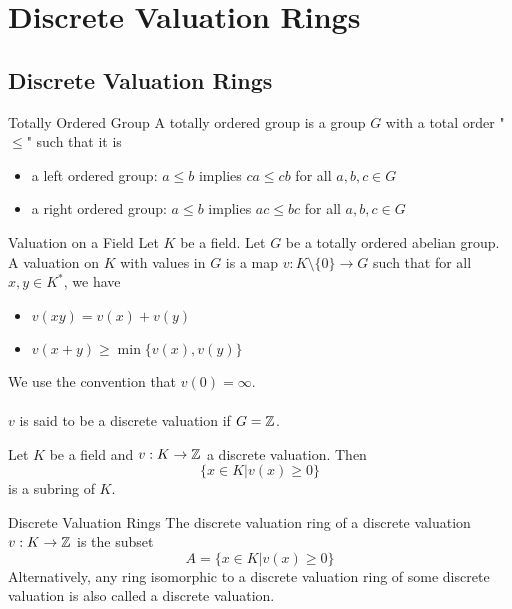 \documentclass[a4paper]{article}
\begin{document}
\pagebreak
\section{Discrete Valuation Rings}
\subsection{Discrete Valuation Rings}
\begin{defn}{Totally Ordered Group}{} A totally ordered group is a group $G$ with a total order "$\leq$" such that it is
\begin{itemize}
\item a left ordered group: $a\leq b$ implies $ca\leq cb$ for all $a,b,c\in G$
\item a right ordered group: $a\leq b$ implies $ac\leq bc$ for all $a,b,c\in G$
\end{itemize}
\end{defn}

\begin{defn}{Valuation on a Field}{} Let $K$ be a field. Let $G$ be a totally ordered abelian group. A valuation on $K$ with values in $G$ is a map $v:K\setminus\{0\}\to G$ such that for all $x,y\in K^\ast$, we have 
\begin{itemize}
\item $v(xy)=v(x)+v(y)$
\item $v(x+y)\geq\min\{v(x),v(y)\}$
\end{itemize}
We use the convention that $v(0)=\infty$. \\~\\
$v$ is said to be a discrete valuation if $G=\mathbb{Z}$. 
\end{defn}

\begin{prp}{}{} Let $K$ be a field and $v:K\to\mathbb{Z}$ a discrete valuation. Then $$\{x\in K|v(x)\geq 0\}$$ is a subring of $K$. 
\end{prp}

\begin{defn}{Discrete Valuation Rings}{} The discrete valuation ring of a discrete valuation $v:K\to\mathbb{Z}$ is the subset $$A=\{x\in K|v(x)\geq 0\}$$
Alternatively, any ring isomorphic to a discrete valuation ring of some discrete valuation is also called a discrete valuation. 
\end{defn}
\end{document}
